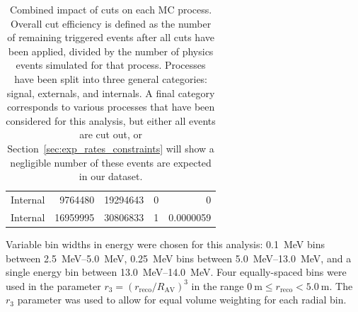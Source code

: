 \begin{table}
\begin{center}
\begin{tabulary}{\textwidth}{c R R R R}
            Internal  & \num{9764480} & \num{19294643} & \num{0} & 0 \\
            Internal  & \num{16959995} & \num{30806833} & \num{1} & 0.0000059 \\
            \hline
        \end{tabulary}
    \end{center}
    \caption[Combined impact of cuts on each MC process.]
    {Combined impact of cuts on each MC process. Overall cut efficiency is defined as the number of remaining triggered events after all cuts have been applied, divided by the number of physics events simulated for that process. Processes have been split into three general categories: signal, externals, and internals. A final category corresponds to various processes that have been considered for this analysis, but either all events are cut out, or Section~\ref{sec:exp_rates_constraints} will show a negligible number of these events are expected in our dataset.}
    \label{tab:MC_cut_effs}
\end{table}

Variable bin widths in energy were chosen for this analysis: \SI{0.1}{\MeV} bins between \SI{2.5}{\MeV}--\SI{5.0}{\MeV}, \SI{0.25}{\MeV} bins between \SI{5.0}{\MeV}--\SI{13.0}{\MeV}, and a single energy bin between \SI{13.0}{\MeV}--\SI{14.0}{\MeV}. Four equally-spaced bins were used in the parameter $r_{3} = (r_{\mathrm{reco}}/R_{\mathrm{AV}})^{3}$ in the range $\SI{0}{\m}\le r_{\mathrm{reco}} < \SI{5.0}{\m}$. The $r_{3}$ parameter was used to allow for equal volume weighting for each radial bin.


